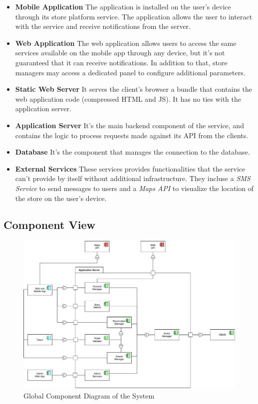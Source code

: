 \begin{itemize}
    \item \textbf{Mobile Application} The application is installed on the user's device through its store platform service. The application allows the user to interact with the service and receive notifications from the server.
    \item \textbf{Web Application} The web application allows users to access the same services available on the mobile app through any device, but it's not guaranteed that it can receive notifications. In addition to that, store managers may access a dedicated panel to configure additional parameters.
    \item \textbf{Static Web Server} It serves the client's browser a bundle that contains the web application code (compressed HTML and JS). It has no ties with the application server.
    \item \textbf{Application Server} It's the main backend component of the service, and contains the logic to process requests made against its API from the clients.
    \item \textbf{Database} It's the component that manages the connection to the database.
    \item \textbf{External Services} These services provides functionalities that the service can't provide by itself without additional infrastructure. They incluse a \emph{SMS Service} to send messages to users and a \emph{Maps API} to visualize the location of the store on the user's device.
\end{itemize}

\subsection{Component View}
\begin{figure}[H]
    \includegraphics[width=\linewidth]{images/draw.io/component.pdf}
    \caption{Global Component Diagram of the System}
    \label{fig:component}
\end{figure}

